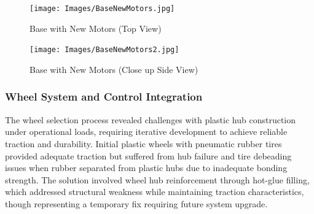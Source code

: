 \begin{figure}[H]
    \centering
    \begin{minipage}{0.45\textwidth}
        \centering
        \texttt{[image: Images/BaseNewMotors.jpg]}
        \caption{Base with New Motors (Top View)}
        \label{fig:base_new_motors}
    \end{minipage}
    \hfill
    \begin{minipage}{0.45\textwidth}
        \centering
        \texttt{[image: Images/BaseNewMotors2.jpg]}
        \caption{Base with New Motors (Close up Side View)}
        \label{fig:base_new_motors_side}
    \end{minipage}
\end{figure}

\subsubsection{Wheel System and Control Integration}

The wheel selection process revealed challenges with plastic hub construction under operational loads, requiring iterative development to achieve reliable traction and durability. Initial plastic wheels with pneumatic rubber tires provided adequate traction but suffered from hub failure and tire debeading issues when rubber separated from plastic hubs due to inadequate bonding strength. The solution involved wheel hub reinforcement through hot-glue filling, which addressed structural weakness while maintaining traction characteristics, though representing a temporary fix requiring future system upgrade.

